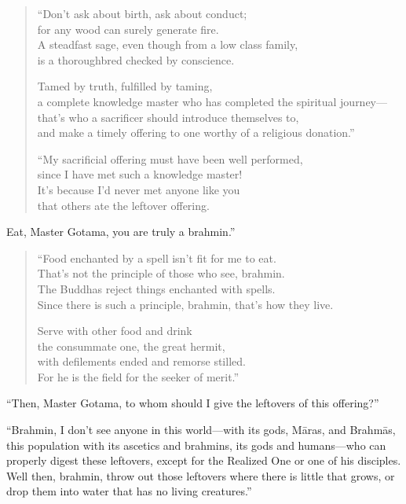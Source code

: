 \documentclass[12pt,openany]{book}%
\begin{document}
\begin{verse}%
“Don’t ask about birth, ask about conduct; \\
for any wood can surely generate fire. \\
A steadfast sage, even though from a low class family, \\
is a thoroughbred checked by conscience. 

Tamed by truth, fulfilled by taming, \\
a complete knowledge master who has completed the spiritual journey—\\
that’s who a sacrificer should introduce themselves to, \\
and make a timely offering to one worthy of a religious donation.” 

“My sacrificial offering must have been well performed, \\
since I have met such a knowledge master! \\
It’s because I’d never met anyone like you \\
that others ate the leftover offering. 

%
\end{verse}

Eat, Master Gotama, you are truly a brahmin.” 

\begin{verse}%
“Food enchanted by a spell isn’t fit for me to eat. \\
That’s not the principle of those who see, brahmin. \\
The Buddhas reject things enchanted with spells. \\
Since there is such a principle, brahmin, that’s how they live. 

Serve with other food and drink \\
the consummate one, the great hermit, \\
with defilements ended and remorse stilled. \\
For he is the field for the seeker of merit.” 

%
\end{verse}

“Then, Master Gotama, to whom should I give the leftovers of this offering?” 

“Brahmin, I don’t see anyone in this world—with its gods, \textsanskrit{Māras}, and \textsanskrit{Brahmās}, this population with its ascetics and brahmins, its gods and humans—who can properly digest these leftovers, except for the Realized One or one of his disciples. Well then, brahmin, throw out those leftovers where there is little that grows, or drop them into water that has no living creatures.” 
\end{document}
